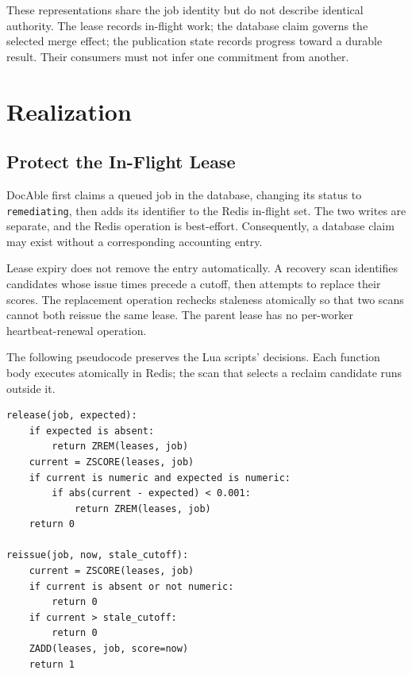 These representations share the job identity but do not describe identical authority. The lease records in-flight work; the database claim governs the selected merge effect; the publication state records progress toward a durable result. Their consumers must not infer one commitment from another.

\section{Realization}

\subsection*{Protect the In-Flight Lease}



DocAble first claims a queued job in the database, changing its status to \texttt{remediating}, then adds its identifier to the Redis in-flight set. The two writes are separate, and the Redis operation is best-effort. Consequently, a database claim may exist without a corresponding accounting entry.

Lease expiry does not remove the entry automatically. A recovery scan identifies candidates whose issue times precede a cutoff, then attempts to replace their scores. The replacement operation rechecks staleness atomically so that two scans cannot both reissue the same lease. The parent lease has no per-worker heartbeat-renewal operation.

The following pseudocode preserves the Lua scripts' decisions. Each function body executes atomically in Redis; the scan that selects a reclaim candidate runs outside it.

\begin{verbatim}
release(job, expected):
    if expected is absent:
        return ZREM(leases, job)
    current = ZSCORE(leases, job)
    if current is numeric and expected is numeric:
        if abs(current - expected) < 0.001:
            return ZREM(leases, job)
    return 0

reissue(job, now, stale_cutoff):
    current = ZSCORE(leases, job)
    if current is absent or not numeric:
        return 0
    if current > stale_cutoff:
        return 0
    ZADD(leases, job, score=now)
    return 1
\end{verbatim}

